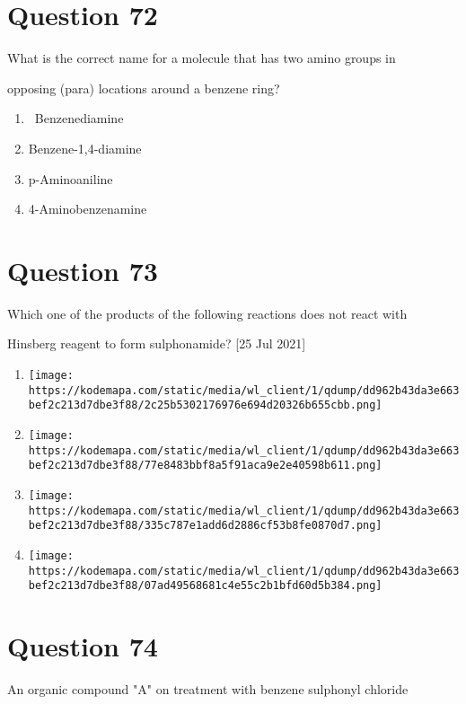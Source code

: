 \documentclass{article}
\begin{document}
\section*{Question 72}
{What is the correct name for a molecule that has two amino groups in

opposing (para) locations around a benzene ring?}


\begin{enumerate}[label=(\alph*)]
\item {~Benzenediamine}


\item {Benzene-1,4-diamine}


\item {p-Aminoaniline}


\item {4-Aminobenzenamine}


\end{enumerate}
\newpage
\section*{Question 73}
Which one of the products of the following reactions does not react with

Hinsberg reagent to form sulphonamide? {[}25 Jul 2021{]}


\begin{enumerate}[label=(\alph*)]
\item \texttt{[image: https://kodemapa.com/static/media/wl\_client/1/qdump/dd962b43da3e663bef2c213d7dbe3f88/2c25b5302176976e694d20326b655cbb.png]}


\item \texttt{[image: https://kodemapa.com/static/media/wl\_client/1/qdump/dd962b43da3e663bef2c213d7dbe3f88/77e8483bbf8a5f91aca9e2e40598b611.png]}


\item \texttt{[image: https://kodemapa.com/static/media/wl\_client/1/qdump/dd962b43da3e663bef2c213d7dbe3f88/335c787e1add6d2886cf53b8fe0870d7.png]}


\item \texttt{[image: https://kodemapa.com/static/media/wl\_client/1/qdump/dd962b43da3e663bef2c213d7dbe3f88/07ad49568681c4e55c2b1bfd60d5b384.png]}


\end{enumerate}
\newpage
\section*{Question 74}
An organic compound "A" on treatment with benzene sulphonyl chloride
\end{document}
